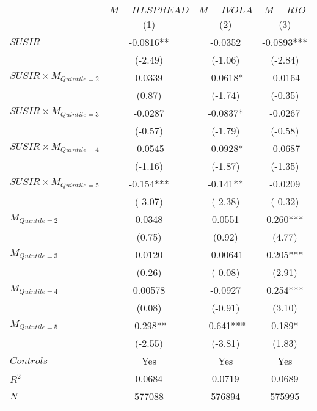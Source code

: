 \begin{tabular}{lccc}
\hline
\hline
        & $M = HLSPREAD$ & $M = IVOLA$ & $M = RIO$ \bigstrut[t]\\
        & (1)     & (2)     & (3) \bigstrut[b]\\
\hline
$SUSIR$ & -0.0816** & -0.0352 & -0.0893*** \bigstrut[t]\\
        & (-2.49) & (-1.06) & (-2.84) \\
$SUSIR \times M_{Quintile=2}$ & 0.0339  & -0.0618* & -0.0164 \\
        & (0.87)  & (-1.74) & (-0.35) \\
$SUSIR \times  M_{Quintile=3}$ & -0.0287 & -0.0837* & -0.0267 \\
        & (-0.57) & (-1.79) & (-0.58) \\
$SUSIR \times  M_{Quintile=4}$ & -0.0545 & -0.0928* & -0.0687 \\
        & (-1.16) & (-1.87) & (-1.35) \\
$SUSIR \times  M_{Quintile=5}$ & -0.154*** & -0.141** & -0.0209 \\
        & (-3.07) & (-2.38) & (-0.32) \\
$M_{Quintile=2}$ & 0.0348  & 0.0551  & 0.260*** \\
        & (0.75)  & (0.92)  & (4.77) \\
$M_{Quintile=3}$ & 0.0120  & -0.00641 & 0.205*** \\
        & (0.26)  & (-0.08) & (2.91) \\
$M_{Quintile=4}$ & 0.00578 & -0.0927 & 0.254*** \\
        & (0.08)  & (-0.91) & (3.10) \\
$M_{Quintile=5}$ & -0.298** & -0.641*** & 0.189* \\
        & (-2.55) & (-3.81) & (1.83) \bigstrut[b]\\
\hline
$Controls$ & Yes     & Yes     & Yes \bigstrut[t]\\
$R^2$   & 0.0684  & 0.0719  & 0.0689 \\
$N$     & 577088  & 576894  & 575995 \bigstrut[b]\\
\hline
\hline
\end{tabular}%
